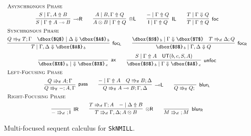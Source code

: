 \documentclass[runningheads]{llncs}
\newcommand{\tl}{\otimes \mathsf{L}}
\newcommand{\tr}{\otimes \mathsf{R}}
\newcommand{\lright}{{\multimap}\mathsf{R}}
\newcommand{\lleft}{{\multimap}\mathsf{L}}
\newcommand{\pass}{\mathsf{pass}}
\newcommand{\unitl}{\mathsf{IL}}
\newcommand{\unitr}{\mathsf{IR}}
\newcommand{\otL}{\tl}
\newcommand{\otR}{\tr}
\newcommand{\lolliR}{\lright}
\newcommand{\lolliL}{\lleft}
\newcommand{\IL}{\unitl}
\newcommand{\IR}{\unitr}
\newcommand{\ax}{\mathsf{ax}}
\newcommand{\ot}{\otimes}
\newcommand{\lolli}{\multimap}
\newcommand{\I}{\mathsf{I}}
\newcommand{\lf}{\Rrightarrow_\mathsf{lf}}
\newcommand{\rf}{\Rrightarrow_\mathsf{rf}}
\newcommand{\SkNMILL}{\texttt{SkNMILL}}
\newcommand{\UT}{\mathsf{UT}}
\newcommand{\up}{\Uparrow}
\newcommand{\dn}{\Downarrow}
\newcommand{\focL}{\mathsf{foc_L}}
\newcommand{\foc}{\mathsf{foc}}
\newcommand{\focR}{\mathsf{foc_R}}
\newcommand{\blurL}{\mathsf{blur_L}}
\newcommand{\blurR}{\mathsf{blur_R}}
\newcommand{\unfoc}{\mathsf{unfoc}}
\begin{document}
\begin{figure}[t]
  \[
  \small
  \begin{array}{c}
    \multicolumn{1}{l}{\text{\textsc{Asynchronous Phase}}} \\[4pt]
      \infer[\lolliR]{S \mid \Gamma \up A \lolli B}{S \mid \Gamma , A \up B}
    \qquad
    \infer[\otL]{A \ot B \mid \Gamma \up Q}{A \mid  B , \Gamma \up Q}
    \qquad
      \infer[\IL]{\I \mid \Gamma \up Q}{- \mid \Gamma \up Q}    
    \qquad
        \infer[\foc]{T \mid \Gamma \up Q}{
      T \mid \Gamma \dn Q
    }
    \\[4pt]
    \multicolumn{1}{l}{\text{\textsc{Synchronous Phase}}} \\[4pt]
        \infer[\focL]{T \mid \Gamma , \Delta \dn \dbox{$A$}_{\, b}}{
          Q \lf T ; \Gamma &
          \dbox{$Q$} \mid \Delta \dn \dbox{$A$}_{\, b}
        }
    \qquad
    \infer[\focR]{\dbox{$S$}_{\, b} \mid \Gamma,\Delta \dn Q}{
      \dbox{$S$}_{\, b} \mid \Gamma \dn \dbox{$T$}
      &
      T \rf \Delta ; Q
    }
    \\[6pt]
        \infer[\ax]{\dbox{$X$}_{\, b} \mid ~ \dn \dbox{$X$}_{\, c}}{}
    \qquad
    \infer[\unfoc]{\dbox{$S$}_{\,b} \mid \Gamma \dn \dbox{$A$}_{\,c}}{
      S \mid \Gamma \up A
      &
      \UT(b,c,S,A)
    }
    \\[4pt]
    \multicolumn{1}{l}{\text{\textsc{Left-Focusing Phase}}} \\[4pt]
    \infer[\pass]{Q \lf - ; A , \Gamma}{
      Q \lf A ; \Gamma
    }
    \qquad
    \infer[\lolliL]{Q \lf A \lolli B ; \Gamma , \Delta}{
      - \mid \Gamma \up A
      &
      Q \lf B ;  \Delta
    }
    \qquad
        \infer[\blurL]{Q \lf Q ; ~}{
      }    
    \\[4pt]
    \multicolumn{1}{l}{\text{\textsc{Right-Focusing Phase}}} \\[4pt]
    \infer[\IR]{- \rf ~ ; \I}{}
    \qquad
    \infer[\otR]{T \rf \Gamma , \Delta ; A \ot B}{
      T \rf \Gamma ; A
      &
      - \mid \Delta \up B
    }
    \qquad
        \infer[\blurR]{M \rf ~ ; M}{}
    \end{array}
  \]
  \caption{Multi-focused sequent calculus for \SkNMILL.} 
  \label{fig:multi-focus}
\end{figure}
\end{document}
